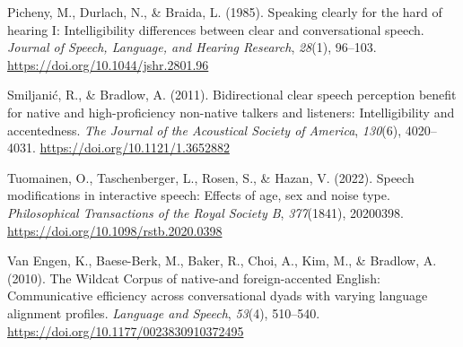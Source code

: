 \documentclass[
  man,
  floatsintext,
  longtable,
  nolmodern,
  notxfonts,
  notimes,
  colorlinks=true,linkcolor=blue,citecolor=blue,urlcolor=blue]{apa7}
\newlength{\cslhangindent}
\newenvironment{CSLReferences}[2] %
 {\begin{list}{}{%
  \setlength{\itemindent}{0pt}
  \setlength{\leftmargin}{0pt}
  \setlength{\parsep}{0pt}
  \ifodd #1
   \setlength{\leftmargin}{\cslhangindent}
   \setlength{\itemindent}{-1\cslhangindent}
  \fi
  \setlength{\itemsep}{#2\baselineskip}}}
 {\end{list}}
\begin{document}
\begin{CSLReferences}{1}{0}
Picheny, M., Durlach, N., \& Braida, L. (1985). Speaking clearly for the
hard of hearing {I}: {Intelligibility} differences between clear and
conversational speech. \emph{Journal of Speech, Language, and Hearing
Research}, \emph{28}(1), 96--103.
\url{https://doi.org/10.1044/jshr.2801.96}

Smiljanić, R., \& Bradlow, A. (2011). Bidirectional clear speech
perception benefit for native and high-proficiency non-native talkers
and listeners: Intelligibility and accentedness. \emph{The Journal of
the Acoustical Society of America}, \emph{130}(6), 4020--4031.
\url{https://doi.org/10.1121/1.3652882}

Tuomainen, O., Taschenberger, L., Rosen, S., \& Hazan, V. (2022). Speech
modifications in interactive speech: Effects of age, sex and noise type.
\emph{Philosophical Transactions of the Royal Society B},
\emph{377}(1841), 20200398. \url{https://doi.org/10.1098/rstb.2020.0398}

Van Engen, K., Baese-Berk, M., Baker, R., Choi, A., Kim, M., \& Bradlow,
A. (2010). The {Wildcat} {Corpus} of native-and foreign-accented
{English}: {Communicative} efficiency across conversational dyads with
varying language alignment profiles. \emph{Language and Speech},
\emph{53}(4), 510--540. \url{https://doi.org/10.1177/0023830910372495}

\end{CSLReferences}
\end{document}
